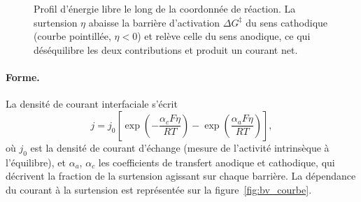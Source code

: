 \begin{figure}[htbp]
\centering
{}
\caption{Profil d'énergie libre le long de la coordonnée de réaction. La
surtension $\eta$ abaisse la barrière d'activation $\Delta G^\ddagger$ du
sens cathodique (courbe pointillée, $\eta<0$) et relève celle du sens
anodique, ce qui déséquilibre les deux contributions et produit un courant
net.}
\label{fig:bv_barriere}
\end{figure}

\paragraph{Forme.}
La densité de courant interfaciale s'écrit
\begin{equation}
j = j_0 \left[\exp\!\left(-\frac{\alpha_c F \eta}{RT}\right)
             - \exp\!\left(\frac{\alpha_a F \eta}{RT}\right)\right],
\label{eq:bv_cinetique}
\end{equation}
où $j_0$ est la densité de courant d'échange (mesure de l'activité
intrinsèque à l'équilibre), et $\alpha_a$, $\alpha_c$ les coefficients de
transfert anodique et cathodique, qui décrivent la fraction de la surtension
agissant sur chaque barrière. La dépendance du courant à la surtension est
représentée sur la figure~\ref{fig:bv_courbe}.

